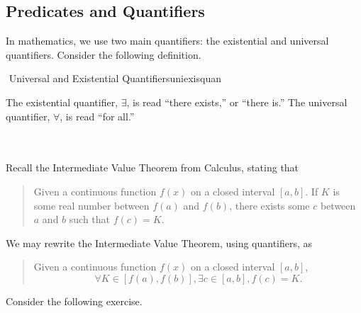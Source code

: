     \subsection{Predicates and Quantifiers}
    
        In mathematics, we use two main quantifiers: the existential and universal quantifiers. Consider the following definition.
        \begin{definition}{\Stop\,\,Universal and Existential Quantifiers}{uniexisquan}
        
            The existential quantifier, \(\exists\), is read ``there exists,'' or ``there is.'' The universal quantifier, \(\forall\), is read ``for all.''
        
        \end{definition}
        \vphantom
        \\
        \\
        Recall the Intermediate Value Theorem from Calculus, stating that 
        \begin{quote}
            Given a continuous function \(f(x)\) on a closed interval \([a,b]\). If \(K\) is some real number between \(f(a)\) and \(f(b)\), there exists some \(c\) between \(a\) and \(b\) such that \(f(c)=K\).
        \end{quote}
        We may rewrite the Intermediate Value Theorem, using quantifiers, as
        \begin{quote}
            Given a continuous function \(f(x)\) on a closed interval \([a,b]\),
            \begin{equation*}
                \forall K\in[f(a),f(b)],\exists c\in[a,b],f(c)=K.
            \end{equation*}
        \end{quote}
        \pagebreak
        Consider the following exercise.
